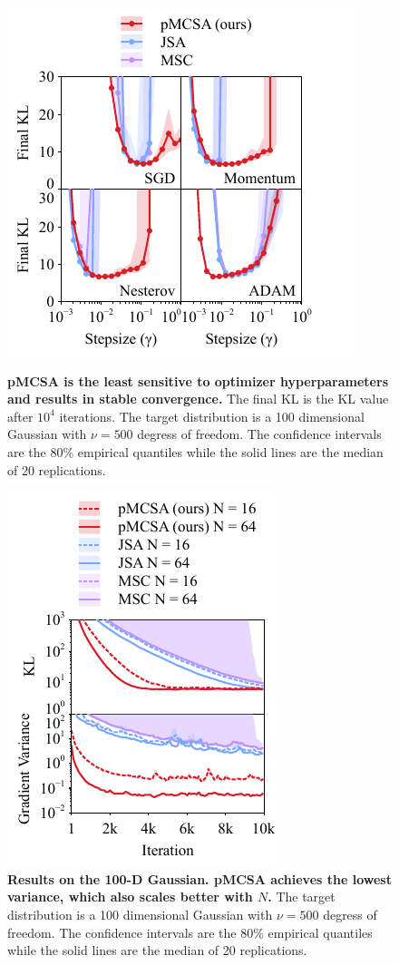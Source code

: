 \begin{figure}
  \begin{minipage}{.5\textwidth}
    \centering
    \includegraphics[scale=1.1]{figures/stepsize_01.pdf}
    \caption{\textbf{pMCSA is the least sensitive to optimizer hyperparameters and results in stable convergence.}
      The final KL is the KL value after \(10^4\) iterations.
      The target distribution is a 100 dimensional Gaussian with \(\nu = 500\) degress of freedom.
      The confidence intervals are the 80\% empirical quantiles while the solid lines are the median of 20 replications.}
  \end{minipage}\hspace{0.1in}
  \begin{minipage}{0.45\textwidth}
    \centering
    \includegraphics[scale=1.1]{figures/gaussian_01.pdf}
    \caption{\textbf{Results on the 100-D Gaussian. pMCSA achieves the lowest variance, which also scales better with \(N\).}
      The target distribution is a 100 dimensional Gaussian with \(\nu = 500\) degress of freedom.
      The confidence intervals are the 80\% empirical quantiles while the solid lines are the median of 20 replications.}\label{fig:gaussian}
  \end{minipage}
\end{figure}

